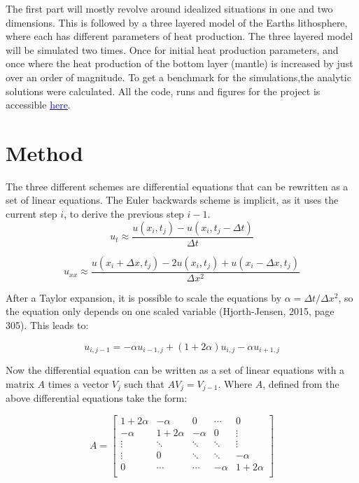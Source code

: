 \documentclass[10pt,a4paper]{article}
\begin{document}
\noindent The first part will mostly revolve around idealized situations in one and two dimensions. This is followed by a three layered model of the Earths lithosphere, where each has different parameters of heat production. The three layered model will be simulated two times. Once for initial heat production parameters, and once where the heat production of the bottom layer (mantle) is increased by just over an order of magnitude. To get a benchmark for the simulations,the analytic solutions were calculated. All the code, runs and figures for the project is accessible \href{https://github.com/VemundStenbekkThorkildsen/Assignment5}{\textcolor{blue}{here}}.  



\section*{Method}

\noindent The three different schemes are differential equations that can be rewritten as a set of linear equations. The Euler backwards scheme is implicit, as it uses the current step $i$, to derive the previous step $i-1$.
\\
\begin{equation}
u_t \approx \frac{u(x_i,t_j) - u(x_i,t_j - \Delta t)}{\Delta t}
\end{equation}

\begin{equation}
u_{xx} \approx \frac{u(x_i + \Delta x,t_j) - 2u(x_i,t_j) + u(x_i - \Delta x,t_j)}{\Delta x^2}
\end{equation}

\noindent After a Taylor expansion, it is possible to scale the equations by $\alpha = \Delta t / \Delta x^2$, so the equation only depends on one scaled variable (Hjorth-Jensen, 2015, page 305). This leads to:

\begin{equation}
u_{i,j-1} = -\alpha u_{i-1,j} + (1 + 2\alpha)u_{i,j} - \alpha u_{i+1,j}
\end{equation}

\noindent Now the differential equation can be written as a set of linear equations with a matrix $A$ times a vector $V_j$ such that $AV_j = V_{j-1}$. Where $A$, defined from the above differential equations take the form:

\begin{equation}
A = \begin{bmatrix}
1 + 2\alpha & -\alpha & 0 & \cdots &0\\
-\alpha & 1 + 2\alpha & -\alpha & 0 & \vdots\\
\vdots & \ddots & \ddots & \ddots & \vdots\\
\vdots & 0 & \ddots & \ddots & -\alpha\\
0 & \cdots & \cdots & -\alpha & 1 + 2\alpha\\

\end{bmatrix}
\end{equation}
\end{document}
